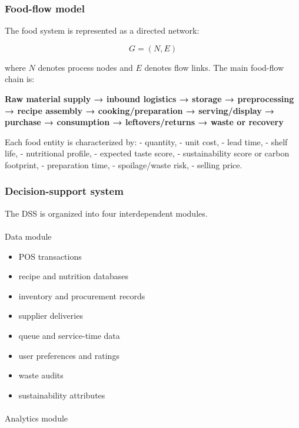 \documentclass[
  letterpaper,
  DIV=11,
  numbers=noendperiod]{scrartcl}
\makeatletter
\let\oldparagraph\paragraph
\renewcommand{\paragraph}{
    \@ifstar
      \xxxParagraphStar
      \xxxParagraphNoStar
  }
\newcommand{\xxxParagraphStar}[1]{\oldparagraph*{#1}\mbox{}}
\newcommand{\xxxParagraphNoStar}[1]{\oldparagraph{#1}\mbox{}}
\providecommand{\tightlist}{%
  \setlength{\itemsep}{0pt}\setlength{\parskip}{0pt}}
\makeatother
\begin{document}
\subsubsection{Food-flow model}\label{food-flow-model}

The food system is represented as a directed network:

\[
G = (N,E)
\]

where \(N\) denotes process nodes and \(E\) denotes flow links. The main
food-flow chain is:

\textbf{Raw material supply → inbound logistics → storage →
preprocessing → recipe assembly → cooking/preparation → serving/display
→ purchase → consumption → leftovers/returns → waste or recovery}

Each food entity is characterized by: - quantity, - unit cost, - lead
time, - shelf life, - nutritional profile, - expected taste score, -
sustainability score or carbon footprint, - preparation time, -
spoilage/waste risk, - selling price.

\subsubsection{Decision-support system}\label{decision-support-system}

The DSS is organized into four interdependent modules.

\paragraph{Data module}\label{data-module}

\begin{itemize}
\tightlist
\item
  POS transactions
\item
  recipe and nutrition databases
\item
  inventory and procurement records
\item
  supplier deliveries
\item
  queue and service-time data
\item
  user preferences and ratings
\item
  waste audits
\item
  sustainability attributes
\end{itemize}

\paragraph{Analytics module}\label{analytics-module}
\end{document}

